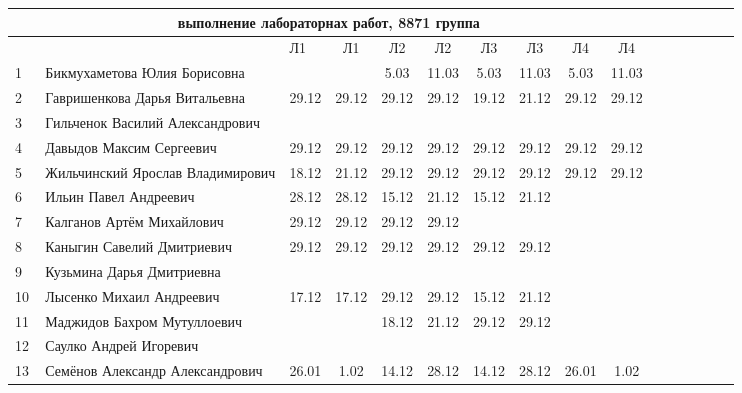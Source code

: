 \documentclass[a4paper,landscape,11pt]{article}
\begin{document}
\newpage
%
\begin{tabular}{l|llccccccccccccc}
\multicolumn{10}{c}{выполнение лабораторнах работ, 8871 группа} \\
\toprule
&&Л1&Л1& Л2&Л2& Л3&Л3& Л4&Л4&\\
\midrule
1\,& Бикмухаметова Юлия Борисовна     &      &      &  5.03& 11.03&  5.03& 11.03&  5.03& 11.03\\
2\,& Гавришенкова Дарья Витальевна    & 29.12& 29.12& 29.12& 29.12& 19.12& 21.12& 29.12& 29.12\\
3\,& Гильченок Василий Александрович  &\\
4\,& Давыдов Максим Сергеевич         & 29.12& 29.12& 29.12& 29.12& 29.12& 29.12& 29.12& 29.12\\
5\,& Жильчинский Ярослав Владимирович & 18.12& 21.12& 29.12& 29.12& 29.12& 29.12& 29.12& 29.12\\
\midrule
6\,& Ильин Павел Андреевич            & 28.12& 28.12& 15.12& 21.12& 15.12& 21.12& \\
7\,&  Калганов Артём Михайлович       & 29.12& 29.12& 29.12& 29.12&\\
8\,& Каныгин Савелий Дмитриевич       & 29.12& 29.12& 29.12& 29.12& 29.12& 29.12\\
9\,&  Кузьмина Дарья Дмитриевна       &\\
10\,&  Лысенко Михаил Андреевич       &17.12& 17.12& 29.12& 29.12& 15.12& 21.12& \\
\midrule
11\,& Маджидов Бахром Мутуллоевич     &     &      & 18.12& 21.12& 29.12& 29.12\\
12\,&  Саулко Андрей Игоревич         &\\
13\,&  Семёнов Александр Александрович&  26.01& 1.02& 14.12& 28.12& 14.12& 28.12& 26.01& 1.02\\


\bottomrule
\end{tabular}
\end{document}
